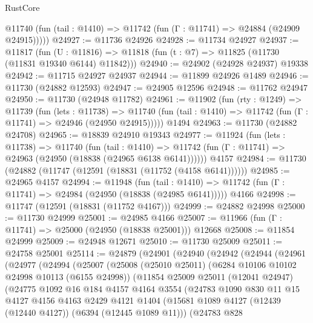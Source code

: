 \begin{lexlean}{RustCore}
\begin{coremodule}
      @11740 (fun (tail : @1410) => @11742 (fun (Γ : @11741) => @24884 (@24909 @24915)))))
@24927 := @11736 @24926
@24928 := @11734 @24927
@24937 := @11817
    (fun (U : @11816) => @11818 (fun (t : @7) => @11825 (@11730 (@11831 @19340 @6144) @11842)))
@24940 := @24902 (@24928 @24937) @19338
@24942 := @11715 @24927 @24937
@24944 := @11899 @24926 @1489
@24946 := @11730 (@24882 @12593)
@24947 := @24905 @12596
@24948 := @11762 @24947
@24950 := @11730 (@24948 @11782)
@24961 := @11902
    (fun (rty : @1249) =>
    @11739
      (fun (lets : @11738) =>
      @11740 (fun (tail : @1410) => @11742 (fun (Γ : @11741) => @24946 (@24950 @24915)))))
    @1494
@24963 := @11730 (@24882 @24708)
@24965 := @18839 @24910 @19343
@24977 := @11924
    (fun (lets : @11738) =>
    @11740
      (fun (tail : @1410) =>
      @11742 (fun (Γ : @11741) => @24963 (@24950 (@18838 (@24965 @6138 @6141))))))
    @4157
@24984 := @11730 (@24882 (@11747 (@12591 (@18831 (@11752 (@4158 @6141))))))
@24985 := @24965 @4157
@24994 := @11948
    (fun (tail : @1410) => @11742 (fun (Γ : @11741) => @24984 (@24950 (@18838 (@24985 @6141)))))
    @4166
@24998 := @11747 (@12591 (@18831 (@11752 @4167)))
@24999 := @24882 @24998
@25000 := @11730 @24999
@25001 := @24985 @4166
@25007 := @11966 (fun (Γ : @11741) => @25000 (@24950 (@18838 @25001))) @12668
@25008 := @11854 @24999
@25009 := @24948 @12671
@25010 := @11730 @25009
@25011 := @24758 @25001
@25114 := @24879
    (@24901
      (@24940
        (@24942
          (@24944
            (@24961
              (@24977
                (@24994
                  (@25007
                    (@25008
                      (@25010 @25011)
                      (@6284 @10106 @10102 @24998 @10113 (@6155 @24998))
                      (@11854
                        @25009
                        @25011
                        (@12041 @24947)
                        (@24775
                          @1092
                          @16
                          @184
                          @4157
                          @4164
                          @3554
                          (@24783
                            @1090
                            @830
                            @11
                            @15
                            @4127
                            @4156
                            @4163
                            @2429
                            @4121
                            @1404
                            (@15681 @1089 @4127 (@12439 (@12440 @4127)) (@6394 (@12445 @1089 @11)))
                            (@24783
                              @828

\end{coremodule}
\end{lexlean}
